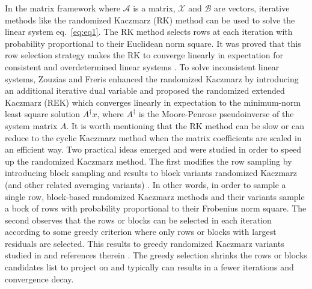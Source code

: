 \documentclass[11pt]{article}
\def\fm#1{\mathcal{#1}}
\begin{document}
In the matrix framework where $\fm A$ is a matrix, $\fm X$ and $\fm B$ are vectors,  iterative methods like the randomized Kaczmarz (RK) method can be  used to solve  the linear system  eq.~\eqref{eq:eq1}.
The RK method selects rows  at each iteration with probability proportional to their Euclidean norm square. It was proved that this row selection strategy  makes the RK to converge linearly in expectation  for consistent and overdetermined linear systems \cite{strohmer2009}.  To solve inconsistent linear systems, Zouzias and Freris \cite{zouzias2013rando} enhanced the randomized Kaczmarz by introducing an additional iterative dual variable and proposed  the randomized extended Kaczmarz (REK) which  converges linearly in expectation to  the minimum-norm least square solution $A^\dagger x$, where $A^\dagger $ is the Moore-Penrose pseudoinverse of the system matrix $A$. 
It is worth mentioning that the RK method can be slow or can reduce to the cyclic Kaczmarz method when the matrix  coefficients are scaled  in an efficient way. %
Two practical ideas emerged and were studied in order to speed up the randomized Kaczmarz method. The first modifies the  row sampling by introducing block sampling and results to block variants randomized Kaczmarz (and  other related averaging variants) \cite{necoara2019faste, du2020rando,tondji2023faster}. In other words, in order to sample a single row, block-based randomized Kaczmarz methods and their variants sample a bock of rows with probability proportional to their Frobenius norm square. The second observes that the rows or blocks can be selected in each iteration according to some greedy  criterion  where only rows or blocks with largest residuals are selected. This  results to greedy randomized Kaczmarz  variants studied in \cite{bai2018greed,bai2019greed,bai2021greed} and references therein . The greedy selection shrinks the rows or blocks candidates  list to project on and typically  can results in a fewer iterations and convergence decay. 
\end{document}
